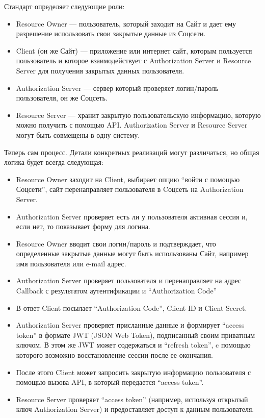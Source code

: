 Стандарт определяет следующие роли:

\begin{itemize}
    \item Resource Owner — пользователь, который заходит на Сайт и дает ему разрешение использовать свои закрытые данные из Соцсети.
    \item Client (он же Сайт) — приложение или интернет сайт, которым пользуется пользователь и которое взаимодействует с Authorization Server и Resource Server для получения закрытых данных пользователя.
    \item Authorization Server — сервер который проверяет логин/пароль пользователя, он же Соцсеть.
    \item Resource Server — хранит закрытую пользовательскую информацию, которую можно получить с помощью API. Authorization Server и Resource Server могут быть совмещены в одну систему.\autocite{OAuth2.0}
\end{itemize}

Теперь сам процесс. Детали конкретных реализаций могут различаться, но общая логика
будет всегда следующая:

\begin{itemize}
    \item Resource Owner заходит на Client, выбирает опцию “войти с помощью Соцсети”, сайт перенаправляет пользователя в Cоцсеть на Authorization Server.
    \item Authorization Server проверяет есть ли у пользователя активная сессия и, если нет, то показывает форму для логина.
    \item Resource Owner вводит свои логин/пароль и подтверждает, что определенные закрытые данные могут быть использованы Сайт, например имя пользователя или e-mail адрес.
    \item Authorization Server проверяет пользователя и перенаправляет на адрес Callback с результатом аутентификации и “Authorization Code”
    \item В ответ Client посылает “Authorization Code”, Client ID и Client Secret.
    \item Authorization Server проверяет присланные данные и формирует “access token” в формате JWT (JSON Web Token), подписанный своим приватным ключом. В этом же JWT может содержаться и “refresh token”, c помощью которого возможно восстановление сессии после ее окончания.
    \item После этого Client может запросить закрытую информацию пользователя с помощью вызова API, в который передается “access token”.
    \item Resource Server проверяет “access token” (например, используя открытый ключ Authorization Server) и предоставляет доступ к данным пользователя.\autocite{Authorization}
\end{itemize}

